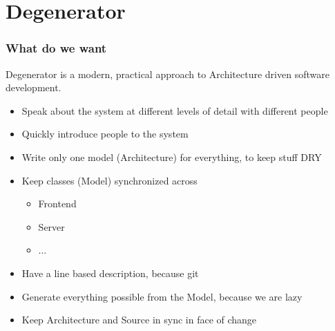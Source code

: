 \documentclass[xelatex,10pt]{beamer}
\begin{document}
\section{Degenerator}
\begin{frame}
	\frametitle{What do we want}
	Degenerator is a modern, practical approach to Architecture driven software
development.
	\vfill
	\pause
	\begin{itemize}
		\item Speak about the system at different levels of detail
		with different people
		\item Quickly introduce people to the system
		\item Write only one model (Architecture) for everything, to keep stuff DRY
		\item Keep classes (Model) synchronized across
		\begin{itemize}
			\item Frontend
			\item Server
			\item \(\dots\)
		\end{itemize}
		\item Have a line based description, because git
		\item Generate everything possible from the Model, because we are lazy
		\item Keep Architecture and Source in sync in face of change
	\end{itemize}
\end{frame}
\end{document}
